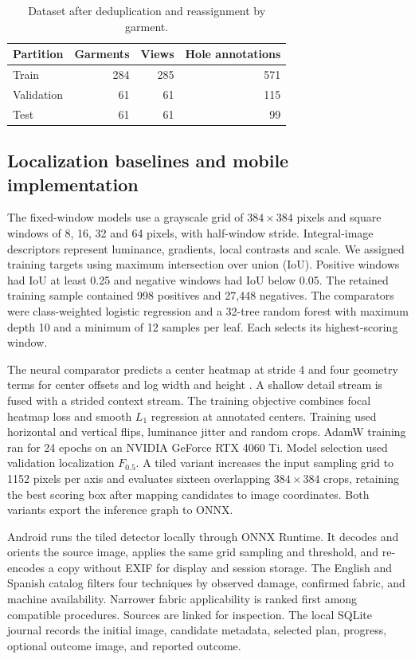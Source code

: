 \begin{table}[htbp]
  \centering
  \caption{Dataset after deduplication and reassignment by garment.}
  \begin{tabular}{lrrr}
    \toprule
    Partition & Garments & Views & Hole annotations \\
    \midrule
    Train & 284 & 285 & 571 \\
    Validation & 61 & 61 & 115 \\
    Test & 61 & 61 & 99 \\
    \bottomrule
  \end{tabular}
  \label{tab:data}
\end{table}

\subsection{Localization baselines and mobile implementation}

The fixed-window models use a grayscale grid of $384 \times 384$ pixels and square windows of 8, 16, 32 and 64 pixels, with half-window stride. Integral-image descriptors represent luminance, gradients, local contrasts and scale. We assigned training targets using maximum intersection over union (IoU). Positive windows had IoU at least 0.25 and negative windows had IoU below 0.05. The retained training sample contained 998 positives and 27,448 negatives. The comparators were class-weighted logistic regression and a 32-tree random forest with maximum depth 10 and a minimum of 12 samples per leaf. Each selects its highest-scoring window.

The neural comparator predicts a center heatmap at stride 4 and four geometry terms for center offsets and log width and height \cite{zhou2019}. A shallow detail stream is fused with a strided context stream. The training objective combines focal heatmap loss and smooth $L_1$ regression at annotated centers. Training used horizontal and vertical flips, luminance jitter and random crops. AdamW training ran for 24 epochs on an NVIDIA GeForce RTX 4060 Ti. Model selection used validation localization $F_{0.5}$. A tiled variant increases the input sampling grid to 1152 pixels per axis and evaluates sixteen overlapping $384 \times 384$ crops, retaining the best scoring box after mapping candidates to image coordinates. Both variants export the inference graph to ONNX.

Android runs the tiled detector locally through ONNX Runtime. It decodes and orients the source image, applies the same grid sampling and threshold, and re-encodes a copy without EXIF for display and session storage. The English and Spanish catalog filters four techniques by observed damage, confirmed fabric, and machine availability. Narrower fabric applicability is ranked first among compatible procedures. Sources are linked for inspection. The local SQLite journal records the initial image, candidate metadata, selected plan, progress, optional outcome image, and reported outcome.


